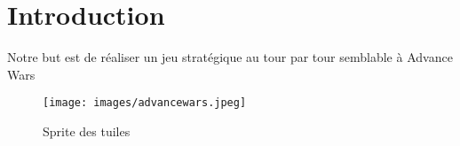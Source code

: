 \section{Introduction}

Notre but est de réaliser un jeu stratégique au tour par tour semblable à Advance Wars


\begin{figure}[h]
    \centering
    \texttt{[image: images/advancewars.jpeg]}
    \caption{Sprite des tuiles}
    \label{fig:Advance Wars}
\end{figure}


%	

\newpage

